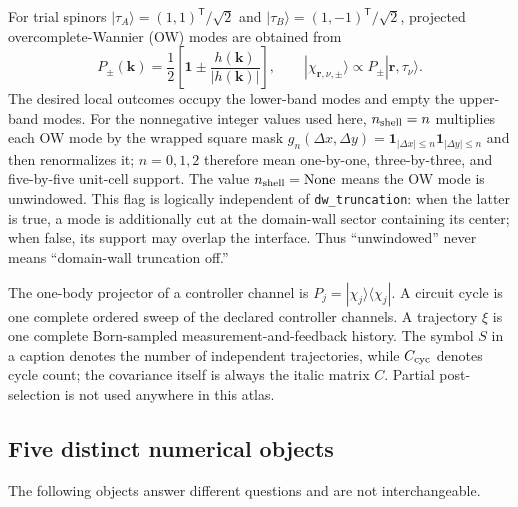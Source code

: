 \documentclass[aps,prb,twocolumn,floatfix,nofootinbib,superscriptaddress]{revtex4-2}
\begin{document}
For trial spinors $|\tau_A\rangle=(1,1)^{\mathsf T}/\sqrt2$ and
$|\tau_B\rangle=(1,-1)^{\mathsf T}/\sqrt2$, projected overcomplete-Wannier (OW) modes
are obtained from
\begin{equation}
 P_\pm(\boldsymbol{k})=\frac12\left[
 \mathbf{1}\pm\frac{h(\boldsymbol{k})}{|h(\boldsymbol{k})|}\right],
 \qquad
 |\chi_{\boldsymbol r,\nu,\pm}\rangle
 \propto P_\pm|\boldsymbol r,\tau_\nu\rangle .
 \label{eq:ow-modes}
\end{equation}
The desired local outcomes occupy the lower-band modes and empty the upper-band modes.
For the nonnegative integer values used here, $n_{\rm shell}=n$ multiplies each OW mode
by the wrapped square mask
$g_n(\Delta x,\Delta y)=\mathbf{1}_{|\Delta x|\leq n}\mathbf{1}_{|\Delta y|\leq n}$
and then renormalizes it; $n=0,1,2$ therefore mean one-by-one, three-by-three, and
five-by-five unit-cell support.  The value $n_{\rm shell}=\mathrm{None}$ means the OW
mode is unwindowed.  This
flag is logically independent of \texttt{dw\_truncation}: when the latter is true, a
mode is additionally cut at the domain-wall sector containing its center; when false,
its support may overlap the interface.  Thus ``unwindowed'' never means ``domain-wall
truncation off.''

The one-body projector of a controller channel is
$P_{j}=|\chi_j\rangle\langle\chi_j|$.  A circuit cycle is one complete ordered sweep of
the declared controller channels.  A trajectory $\xi$ is one complete Born-sampled
measurement-and-feedback history.  The symbol $S$ in a caption denotes the number of
independent trajectories, while $C_{\rm cyc}$ denotes cycle count; the covariance itself
is always the italic matrix $C$.  Partial post-selection is not used anywhere in this
atlas.

\subsection{Five distinct numerical objects}
\label{sec:object-taxonomy}

The following objects answer different questions and are not interchangeable.
\end{document}
